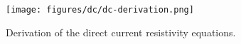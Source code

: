 \begin{figure}[ht]
    \centering
    \texttt{[image: figures/dc/dc-derivation.png]}
    \caption{Derivation of the direct current resistivity equations.}
    \label{fig:dc-derivation}
\end{figure}
